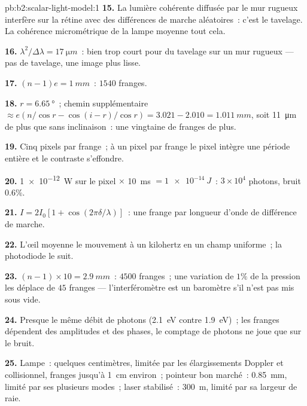 \begin{solution}{pb:b2:scalar-light-model:1}
\textbf{15.} La lumière cohérente diffusée par le mur rugueux interfère sur
la rétine avec des différences de marche aléatoires~: c'est le tavelage. La cohérence
micrométrique de la lampe moyenne tout cela.

\textbf{16.} $\lambda^2/\Delta\lambda = \qty{17}{\micro m}$~: bien trop court pour du tavelage sur un
mur rugueux --- pas de tavelage, une image plus lisse.

\textbf{17.} $(n - 1)e = \qty{1}{mm}$~: $1540$ franges.

\textbf{18.} $r = \qty{6.65}{\degree}$~; chemin supplémentaire $\approx e(n/\cos r - \cos(i - r)/\cos r)
= 3.021 - 2.010 = \qty{1.011}{mm}$, soit \qty{11}{\micro m} de plus que sans inclinaison~: une
vingtaine de franges de plus.

\textbf{19.} Cinq pixels par frange~; à un pixel par frange le pixel
intègre une période entière et le contraste s'effondre.

\textbf{20.} \qty{1e-12}{W} sur le pixel $\times$ \qty{10}{ms} $= \qty{1e-14}{J}$~: $3 \times 10^4$
photons, bruit $0.6\%$.

\textbf{21.} $I = 2I_0[1 + \cos(2\pi\delta/\lambda)]$~: une frange par longueur d'onde de
différence de marche.

\textbf{22.} L'œil moyenne le mouvement à un kilohertz en un champ
uniforme~; la photodiode le suit.

\textbf{23.} $(n - 1) \times 10 = \qty{2.9}{mm}$~: $4500$ franges~; une variation de $1\%$ de
la pression les déplace de $45$ franges --- l'interféromètre est un
baromètre s'il n'est pas mis sous vide.

\textbf{24.} Presque le même débit de photons (\qty{2.1}{eV} contre \qty{1.9}{eV})~;
les franges dépendent des amplitudes et des phases, le comptage de photons ne joue que sur
le bruit.

\textbf{25.} Lampe~: quelques centimètres, limitée par les élargissements Doppler et
collisionnel, franges jusqu'à \qty{1}{cm} environ~; pointeur bon marché~: \qty{0.85}{mm},
limité par ses plusieurs modes~; laser stabilisé~: \qty{300}{m}, limité par
sa largeur de raie.
\end{solution}

